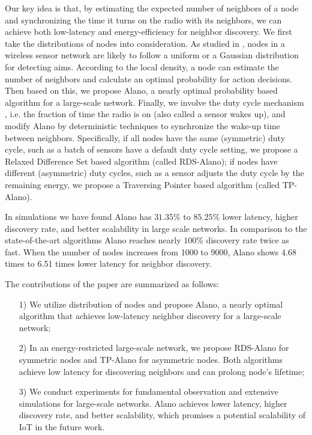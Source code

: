 Our key idea is that, by estimating the expected number of neighbors of a node and synchronizing the time it turns on the radio with its neighbors, 
we can achieve both low-latency and energy-efficiency for neighbor discovery. 
We first take the distributions of nodes into consideration. As studied in \cite{wang2013gaussian}, nodes in a wireless sensor network are likely to follow a uniform or a Gaussian distribution for detecting aims. %
According to the local density, a node can estimate the number of neighbors and calculate an optimal probability for action decisions. Then based on this, we propose Alano, %
a nearly optimal probability based algorithm for a large-scale network. Finally, we involve the duty cycle mechanism \cite{zhang2017performance}, i.e. the fraction of time the radio is on (also called a sensor wakes up), and modify Alano by deterministic techniques to synchronize the wake-up time between neighbors. Specifically, if all nodes have the same (symmetric) duty cycle, such as a batch of sensors have a default duty cycle setting, we propose a Relaxed Difference Set based algorithm (called RDS-Alano); if nodes have different (asymmetric) duty cycles, such as a sensor adjusts the duty cycle by the remaining energy, we propose a Traversing Pointer based algorithm (called TP-Alano).

In simulations we have found Alano has $31.35\%$ to $ 85.25\%$ lower latency, higher discovery rate, and better scalability in large scale networks. %
In comparison to the state-of-the-art algorithms \cite{you2011aloha, sun2014hello, chen2015heterogeneous, bakht2012searchlight}
Alano reaches nearly $100\%$ discovery rate twice as fast. 
When the number of nodes increases from 1000 to 9000, 
Alano shows 4.68 times to 6.51 times lower latency for neighbor discovery.

The contributions of the paper are summarized as follows:
\begin{itemize}
\item[1)] We utilize distribution of nodes and propose Alano, a nearly optimal algorithm that achieves low-latency neighbor discovery for a large-scale network;
\item[2)] In an energy-restricted large-scale network, we propose RDS-Alano for symmetric nodes and TP-Alano for asymmetric nodes. Both algorithms achieve low latency for discovering neighbors and can prolong node's lifetime;
\item[3)] We conduct experiments for fundamental observation and extensive simulations for large-scale networks.  Alano achieves lower latency, higher discovery rate, and better scalability,
which promises a potential scalability of IoT in the future work.  %
\end{itemize}

